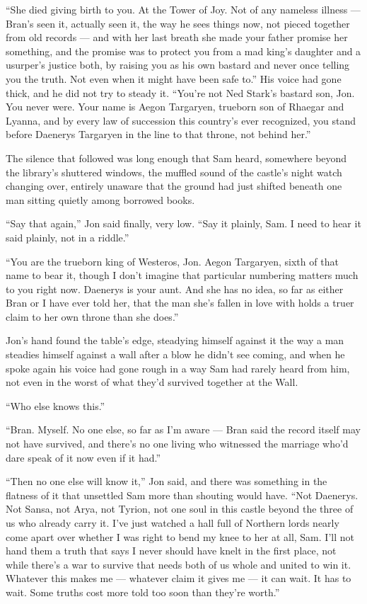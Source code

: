 “She died giving birth to you. At the Tower of Joy. Not of any nameless illness — Bran’s seen it, actually seen it, the way he sees things now, not pieced together from old records — and with her last breath she made your father promise her something, and the promise was to protect you from a mad king’s daughter and a usurper’s justice both, by raising you as his own bastard and never once telling you the truth. Not even when it might have been safe to.” His voice had gone thick, and he did not try to steady it. “You’re not Ned Stark’s bastard son, Jon. You never were. Your name is Aegon Targaryen, trueborn son of Rhaegar and Lyanna, and by every law of succession this country’s ever recognized, you stand before Daenerys Targaryen in the line to that throne, not behind her.”

The silence that followed was long enough that Sam heard, somewhere beyond the library’s shuttered windows, the muffled sound of the castle’s night watch changing over, entirely unaware that the ground had just shifted beneath one man sitting quietly among borrowed books.

“Say that again,” Jon said finally, very low. “Say it plainly, Sam. I need to hear it said plainly, not in a riddle.”

“You are the trueborn king of Westeros, Jon. Aegon Targaryen, sixth of that name to bear it, though I don’t imagine that particular numbering matters much to you right now. Daenerys is your aunt. And she has no idea, so far as either Bran or I have ever told her, that the man she’s fallen in love with holds a truer claim to her own throne than she does.”

Jon’s hand found the table’s edge, steadying himself against it the way a man steadies himself against a wall after a blow he didn’t see coming, and when he spoke again his voice had gone rough in a way Sam had rarely heard from him, not even in the worst of what they’d survived together at the Wall.

“Who else knows this.”

“Bran. Myself. No one else, so far as I’m aware — Bran said the record itself may not have survived, and there’s no one living who witnessed the marriage who’d dare speak of it now even if it had.”

“Then no one else will know it,” Jon said, and there was something in the flatness of it that unsettled Sam more than shouting would have. “Not Daenerys. Not Sansa, not Arya, not Tyrion, not one soul in this castle beyond the three of us who already carry it. I’ve just watched a hall full of Northern lords nearly come apart over whether I was right to bend my knee to her at all, Sam. I’ll not hand them a truth that says I never should have knelt in the first place, not while there’s a war to survive that needs both of us whole and united to win it. Whatever this makes me — whatever claim it gives me — it can wait. It has to wait. Some truths cost more told too soon than they’re worth.”

